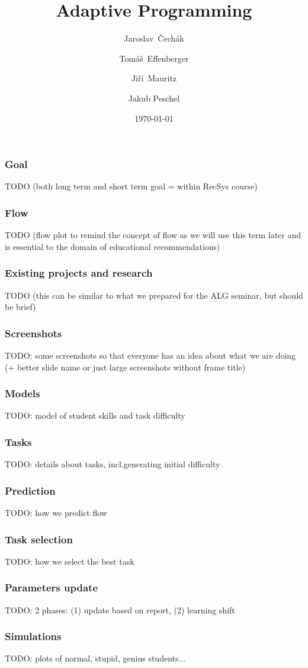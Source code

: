 \documentclass[xcolor=dvipsnames, 14pt]{beamer}
\title{Adaptive Programming}
\author{Jaroslav~Čechák \and Tomáš~Effenberger \and  Jiří~Mauritz \and Jakub Peschel}
\institute{Faculty of Informatics, Masaryk University}
\date{\today}
\begin{document}
\begin{frame}
\titlepage
\end{frame}

\begin{frame}
\frametitle{Goal}
TODO (both long term and short term goal = within RecSys course)
\end{frame}

\begin{frame}
\frametitle{Flow}
TODO (flow plot to remind the concept of flow as we will use this term later and is essential to the domain of educational recommendations)
\end{frame}

\begin{frame}
\frametitle{Existing projects and research}
TODO (this can be similar to what we prepared for the ALG seminar, but should be brief)
\end{frame}

\begin{frame}
\frametitle{Screenshots}
TODO: some screenshots so that everyone has an idea about what we are doing
(+ better slide name or just large screenshots without frame title)
\end{frame}

\begin{frame}
\frametitle{Models}
TODO: model of student skills and task difficulty
\end{frame}

\begin{frame}
\frametitle{Tasks}
TODO: details about tasks, incl.generating initial difficulty
\end{frame}

\begin{frame}
\frametitle{Prediction}
TODO: how we predict flow
\end{frame}

\begin{frame}
\frametitle{Task selection}
TODO: how we select the best task
\end{frame}

\begin{frame}
\frametitle{Parameters update}
TODO: 2 phases: (1) update based on report, (2) learning shift
\end{frame}

\begin{frame}
\frametitle{Simulations}
TODO: plots of normal, stupid, genius students...
\end{frame}
\end{document}
